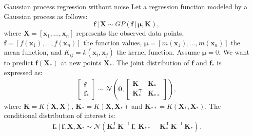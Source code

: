 \begin{frame}{Gaussian process regression without noise}
	Let a regression function modeled by a Gaussian process as follows:
%
\begin{equation*}
       \mathbf{f} \, \lvert\, \mathbf{X} \sim GP(\mathbf{f} \, \lvert\, \boldsymbol\mu, \mathbf{K}), 	
\end{equation*}
where $\mathbf{X} = [\mathbf{x}_1, \ldots, \mathbf{x}_n ]$ represents the observed data points, $\mathbf{f} = \left[ f(\mathbf{x}_1), \ldots, f(\mathbf{x}_n) \right]$ the function values, $\boldsymbol\mu = \left[ m(\mathbf{x}_1), \ldots, m(\mathbf{x}_n) \right]$ the mean function, and $K_{ij} = k(\mathbf{x}_i,\mathbf{x}_j)$ the kernel function. Assume $\boldsymbol\mu=0$. We want to predict $\mathbf{f}(\mathbf{X}_*)$ at new points $\mathbf{X}_*$. The joint distribution of $\mathbf{f}$ and $\mathbf{f}_*$ is expressed as:
%
    \begin{align}
       \begin{bmatrix}\mathbf{f} \\ \mathbf{f}_*\end{bmatrix} \sim \mathcal{N}\left(\mathbf{0}, \begin{bmatrix}\mathbf{K} & \mathbf{K}_* \\ \mathbf{K}_*^\mathsf{T} & \mathbf{K}_{**}\end{bmatrix}\right), \nonumber
    \end{align}
%
where $\mathbf{K}=K(\mathbf{X}, \mathbf{X})$, $\mathbf{K}_* = K(\mathbf{X}, \mathbf{X}_*)$ and $\mathbf{K}_{**}=K(\mathbf{X}_*, \mathbf{X}_*)$. The conditional distribution of interest is:
\begin{align}
       \mathbf{f}_* \, \vert \, \mathbf{f}, \mathbf{X}, \mathbf{X}_* \sim \mathcal{N} \left(\mathbf{K}_*^\mathsf{T} \, \mathbf{K}^{-1} \, \mathbf{f}, \: \mathbf{K}_{**} - \mathbf{K}_*^\mathsf{T} \, \mathbf{K}^{-1} \, \mathbf{K}_* \right). \nonumber
    \end{align}
\end{frame}


